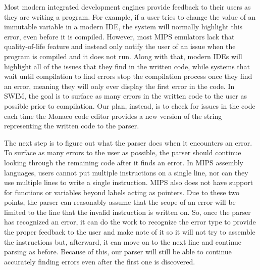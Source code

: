 \documentclass[
    paper=letter,
    parskip=half,
    fontsize=12pt,
    titlepage=firstiscover,
    toc=bibliography,
    numbers=endperiod
]{scrartcl}
\begin{document}
Most modern integrated development engines provide feedback to their
users as they are writing a program. For example, if a user tries to
change the value of an immutable variable in a modern IDE, the system
will normally highlight this error, even before it is compiled. However,
most MIPS emulators lack that quality-of-life feature and instead only
notify the user of an issue when the program is compiled and it does not
run. Along with that, modern IDEs will highlight all of the issues that
they find in the written code, while systems that wait until compilation
to find errors stop the compilation process once they find an error,
meaning they will only ever display the first error in the code. In
SWIM, the goal is to surface as many errors in the written code to the
user as possible prior to compilation. Our plan, instead, is to check
for issues in the code each time the Monaco code editor provides a new
version of the string representing the written code to the parser.

The next step is to figure out what the parser does when it encounters
an error. To surface as many errors to the user as possible, the parser
should continue looking through the remaining code after it finds an
error. In MIPS assembly languages, users cannot put multiple
instructions on a single line, nor can they use multiple lines to write
a single instruction. MIPS also does not have support for functions or
variables beyond labels acting as pointers. Due to these two points, the
parser can reasonably assume that the scope of an error will be limited
to the line that the invalid instruction is written on. So, once the
parser has recognized an error, it can do the work to recognize the
error type to provide the proper feedback to the user and make note of
it so it will not try to assemble the instructions but, afterward, it
can move on to the next line and continue parsing as before. Because of
this, our parser will still be able to continue accurately finding
errors even after the first one is discovered.
\end{document}
